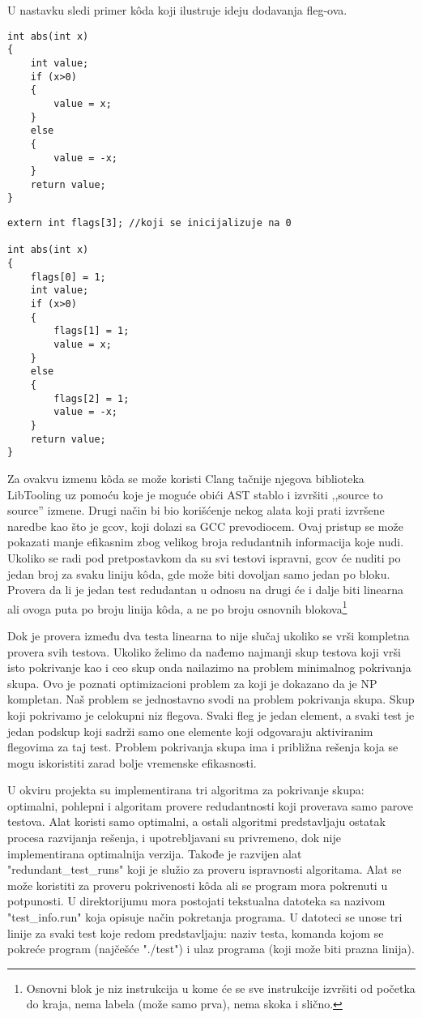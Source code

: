 \documentclass[a4paper]{article}
\begin{document}
U nastavku sledi primer kôda koji ilustruje ideju dodavanja fleg-ova.

\newpage

\begin{lstlisting}
int abs(int x)
{
	int value;
	if (x>0)
	{
		value = x;
	}
	else
	{
		value = -x;
	}
	return value;
}
\end{lstlisting}

\begin{lstlisting}
extern int flags[3]; //koji se inicijalizuje na 0

int abs(int x)
{
	flags[0] = 1;
	int value;
	if (x>0)
	{
		flags[1] = 1;
		value = x;
	}
	else
	{
		flags[2] = 1;
		value = -x;
	}
	return value;
}
\end{lstlisting}

Za ovakvu izmenu kôda se može koristi Clang tačnije njegova biblioteka LibTooling uz pomoću koje je moguće obići AST stablo i izvršiti ,,source to source'' izmene. Drugi način bi bio korišćenje nekog alata koji prati izvršene naredbe kao što je gcov, koji dolazi sa GCC prevodiocem. Ovaj pristup se može pokazati manje efikasnim zbog velikog broja redudantnih informacija koje nudi. Ukoliko se radi pod pretpostavkom da su svi testovi ispravni, gcov će nuditi po jedan broj za svaku liniju kôda, gde može biti dovoljan samo jedan po bloku. Provera da li je jedan test redudantan u odnosu na drugi će i dalje biti linearna ali ovoga puta po broju linija kôda, a ne po broju osnovnih blokova\footnote{Osnovni blok je niz instrukcija u kome će se sve instrukcije izvršiti od početka do kraja, nema labela (može samo prva), nema skoka i slično.} 

Dok je provera između dva testa linearna to nije slučaj ukoliko se vrši kompletna provera svih testova. Ukoliko želimo da nađemo najmanji skup testova koji vrši isto pokrivanje kao i ceo skup onda nailazimo na problem minimalnog pokrivanja skupa. Ovo je poznati optimizacioni problem za koji je dokazano da je NP kompletan. Naš problem se jednostavno svodi na problem pokrivanja skupa. Skup koji pokrivamo je celokupni niz flegova. Svaki fleg je jedan element, a svaki test je jedan podskup koji sadrži samo one elemente koji odgovaraju aktiviranim flegovima za taj test. Problem pokrivanja skupa ima i približna rešenja koja se mogu iskoristiti zarad bolje vremenske efikasnosti. 

U okviru projekta su implementirana tri algoritma za pokrivanje skupa: optimalni, pohlepni i algoritam provere redudantnosti koji proverava samo parove testova. Alat koristi samo optimalni, a ostali algoritmi predstavljaju ostatak procesa razvijanja rešenja, i upotrebljavani su privremeno, dok nije implementirana optimalnija verzija. Takođe je razvijen alat "redundant\_test\_runs" \space koji je služio za proveru ispravnosti algoritama. Alat se može koristiti za proveru pokrivenosti kôda ali se program mora pokrenuti u potpunosti. U direktorijumu mora postojati tekstualna datoteka sa nazivom "test\_info.run" \space koja opisuje način pokretanja programa. U datoteci se unose tri linije za svaki test koje redom predstavljaju: naziv testa, komanda kojom se pokreće program (najčešće "./test") i ulaz programa (koji može biti prazna linija).
\end{document}
